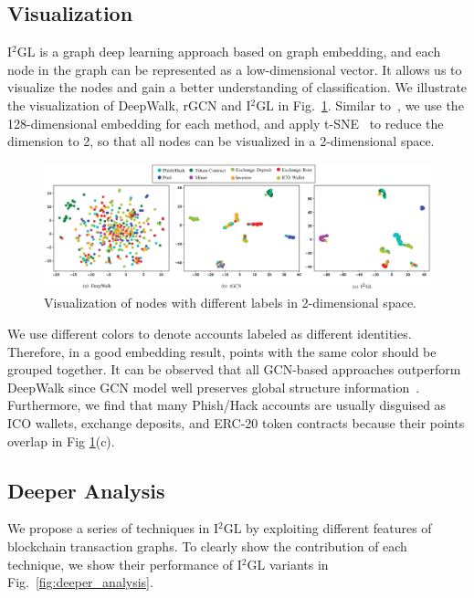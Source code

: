 \subsection{Visualization}
I$^2$GL is a graph deep learning approach based on graph embedding, and each node in the graph can be represented as a low-dimensional vector. It allows us to visualize the nodes and gain a better understanding of classification. We illustrate the visualization of DeepWalk, rGCN and I$^2$GL in Fig.~\ref{fig:visualization}. Similar to~\cite{wang2016structural}, we use the 128-dimensional embedding for each method, and apply t-SNE~\cite{maaten2008visualizing} to reduce the dimension to 2, so that all nodes can be visualized in a 2-dimensional space.

\begin{figure}
	\setlength{\tabcolsep}{-5pt}
  \centering
	\includegraphics[width=\textwidth]{fig/visualization}
	\caption{Visualization of nodes with different labels in 2-dimensional space.}
	\label{fig:visualization}
\end{figure}

We use different colors to denote accounts labeled as different identities. Therefore, in a good embedding result, points with the same color should be grouped together. It can be observed that all GCN-based approaches outperform DeepWalk since GCN model well preserves global structure information~\cite{goyal2018graph}. Furthermore, we find that many Phish/Hack accounts are usually disguised as ICO wallets, exchange deposits, and ERC-20 token contracts because their points overlap in Fig \ref{fig:visualization}(c).

\subsection{Deeper Analysis}
We propose a series of techniques in I$^2$GL by exploiting different features of blockchain transaction graphs. To clearly show the contribution of each technique, we show their performance of I$^2$GL variants in Fig.~\ref{fig:deeper_analysis}.

